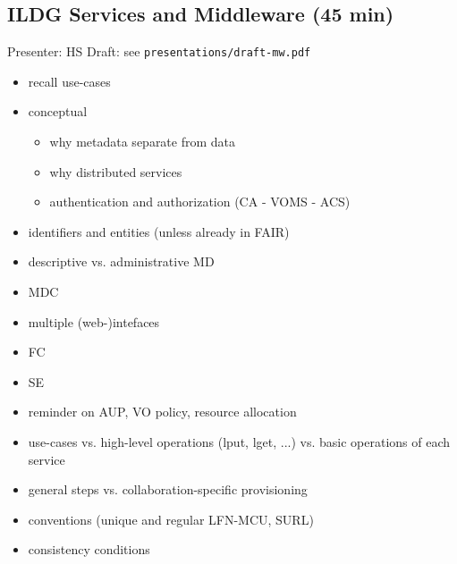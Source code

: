 \documentclass{article}
\begin{document}
\subsection{ILDG Services and Middleware (45 min)}
Presenter: HS
Draft: see {\tt presentations/draft-mw.pdf}
\begin{itemize}
    \item recall use-cases
    \item conceptual
    \begin{itemize}
        \item why metadata separate from data
        \item why distributed services
        \item authentication and authorization (CA - VOMS - ACS)
    \end{itemize}
    \item identifiers and entities (unless already in FAIR)
    \item descriptive vs. administrative MD
    \item MDC
    \item multiple (web-)intefaces
    \item FC
    \item SE
    \item reminder on AUP, VO policy, resource allocation
    \item use-cases vs. high-level operations (lput, lget, ...) vs. basic operations of each service
    \item general steps vs. collaboration-specific provisioning
    \item conventions (unique and regular LFN-MCU, SURL) 
    \item consistency conditions
\end{itemize}
\end{document}
